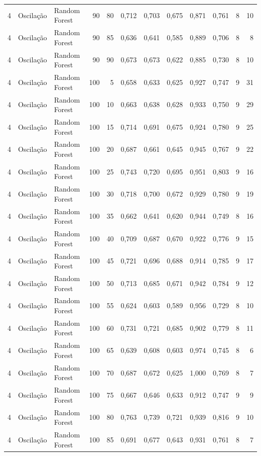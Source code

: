 \begin{longtable}{@{}rllrrrrrrrrr@{}}
4 & Oscilação & Random Forest & 90 & 80 & 0,712 & 0,703 & 0,675 & 0,871 & 0,761 & 8 & 10 \\
4 & Oscilação & Random Forest & 90 & 85 & 0,636 & 0,641 & 0,585 & 0,889 & 0,706 & 8 & 8 \\
4 & Oscilação & Random Forest & 90 & 90 & 0,673 & 0,673 & 0,622 & 0,885 & 0,730 & 8 & 10 \\
4 & Oscilação & Random Forest & 100 & 5 & 0,658 & 0,633 & 0,625 & 0,927 & 0,747 & 9 & 31 \\
4 & Oscilação & Random Forest & 100 & 10 & 0,663 & 0,638 & 0,628 & 0,933 & 0,750 & 9 & 29 \\
4 & Oscilação & Random Forest & 100 & 15 & 0,714 & 0,691 & 0,675 & 0,924 & 0,780 & 9 & 25 \\
4 & Oscilação & Random Forest & 100 & 20 & 0,687 & 0,661 & 0,645 & 0,945 & 0,767 & 9 & 22 \\
4 & Oscilação & Random Forest & 100 & 25 & 0,743 & 0,720 & 0,695 & 0,951 & 0,803 & 9 & 16 \\
4 & Oscilação & Random Forest & 100 & 30 & 0,718 & 0,700 & 0,672 & 0,929 & 0,780 & 9 & 19 \\
4 & Oscilação & Random Forest & 100 & 35 & 0,662 & 0,641 & 0,620 & 0,944 & 0,749 & 8 & 16 \\
4 & Oscilação & Random Forest & 100 & 40 & 0,709 & 0,687 & 0,670 & 0,922 & 0,776 & 9 & 15 \\
4 & Oscilação & Random Forest & 100 & 45 & 0,721 & 0,696 & 0,688 & 0,914 & 0,785 & 9 & 17 \\
4 & Oscilação & Random Forest & 100 & 50 & 0,713 & 0,685 & 0,671 & 0,942 & 0,784 & 9 & 12 \\
4 & Oscilação & Random Forest & 100 & 55 & 0,624 & 0,603 & 0,589 & 0,956 & 0,729 & 8 & 10 \\
4 & Oscilação & Random Forest & 100 & 60 & 0,731 & 0,721 & 0,685 & 0,902 & 0,779 & 8 & 11 \\
4 & Oscilação & Random Forest & 100 & 65 & 0,639 & 0,608 & 0,603 & 0,974 & 0,745 & 8 & 6 \\
4 & Oscilação & Random Forest & 100 & 70 & 0,687 & 0,672 & 0,625 & 1,000 & 0,769 & 8 & 7 \\
4 & Oscilação & Random Forest & 100 & 75 & 0,667 & 0,646 & 0,633 & 0,912 & 0,747 & 9 & 9 \\
4 & Oscilação & Random Forest & 100 & 80 & 0,763 & 0,739 & 0,721 & 0,939 & 0,816 & 9 & 10 \\
4 & Oscilação & Random Forest & 100 & 85 & 0,691 & 0,677 & 0,643 & 0,931 & 0,761 & 8 & 7 \\

\end{longtable}
